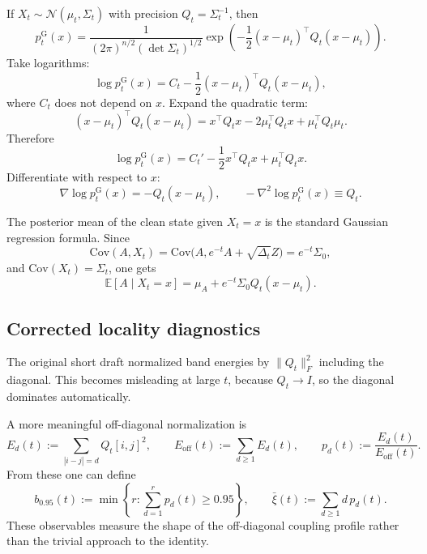 \documentclass[11pt,a4paper]{article}
\newcommand{\E}{\mathbb{E}}
\newcommand{\Cov}{\mathrm{Cov}}
\newcommand{\Dt}{\Delta_t}
\begin{document}
If $X_t \sim \mathcal N(\mu_t,\Sigma_t)$ with precision $Q_t=\Sigma_t^{-1}$, then
\begin{equation}
p_t^{\mathrm G}(x)
=
\frac{1}{(2\pi)^{n/2} (\det \Sigma_t)^{1/2}}
\exp\!\left(-\frac12 (x-\mu_t)^\top Q_t (x-\mu_t)\right).
\label{eq:gaussian-density-general}
\end{equation}
Take logarithms:
\[
\log p_t^{\mathrm G}(x)
=
C_t - \frac12 (x-\mu_t)^\top Q_t (x-\mu_t),
\]
where $C_t$ does not depend on $x$. Expand the quadratic term:
\[
(x-\mu_t)^\top Q_t (x-\mu_t)
=
 x^\top Q_t x - 2 \mu_t^\top Q_t x + \mu_t^\top Q_t \mu_t.
\]
Therefore
\[
\log p_t^{\mathrm G}(x)
=
C_t' - \frac12 x^\top Q_t x + \mu_t^\top Q_t x.
\]
Differentiate with respect to $x$:
\begin{equation}
\nabla \log p_t^{\mathrm G}(x) = -Q_t(x-\mu_t),
\qquad
-\nabla^2 \log p_t^{\mathrm G}(x) \equiv Q_t.
\label{eq:gaussian-score-hessian}
\end{equation}

The posterior mean of the clean state given $X_t=x$ is the standard Gaussian regression formula. Since
\[
\Cov(A,X_t) = \Cov\bigl(A,e^{-t}A+\sqrt{\Dt}Z\bigr) = e^{-t}\Sigma_0,
\]
and $\Cov(X_t)=\Sigma_t$, one gets
\begin{equation}
\E[A\mid X_t=x]
=
\mu_A + e^{-t}\Sigma_0 Q_t (x-\mu_t).
\label{eq:posterior-mean-gaussian}
\end{equation}

\subsection{Corrected locality diagnostics}
\label{sec:locality-diagnostics}

The original short draft normalized band energies by $\|Q_t\|_F^2$ including the diagonal. This becomes misleading at large $t$, because $Q_t \to I$, so the diagonal dominates automatically.

A more meaningful off-diagonal normalization is
\begin{equation}
E_d(t) := \sum_{|i-j|=d} Q_t[i,j]^2,
\qquad
E_{\mathrm{off}}(t) := \sum_{d\ge 1} E_d(t),
\qquad
p_d(t) := \frac{E_d(t)}{E_{\mathrm{off}}(t)}.
\label{eq:offdiag-diagnostics}
\end{equation}
From these one can define
\begin{equation}
b_{0.95}(t) := \min\left\{r:\sum_{d=1}^r p_d(t)\ge 0.95\right\},
\qquad
\bar\xi(t) := \sum_{d\ge 1} d\, p_d(t).
\label{eq:bandwidth-range}
\end{equation}
These observables measure the shape of the off-diagonal coupling profile rather than the trivial approach to the identity.
\end{document}
